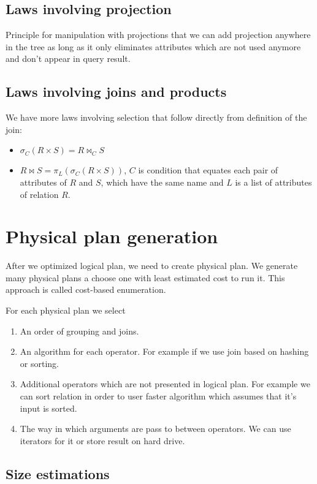 \subsection{Laws involving projection}
Principle for manipulation with projections that we can add projection anywhere in the tree as long as it only eliminates attributes which are not used anymore and don't appear in query result.
\subsection{Laws involving joins and products}

We have more laws involving selection that follow directly from definition of the join:
\begin{itemize}
\item $\sigma_{C}(R \times S)=R \Join_{C} S$
\item $R \Join S=\pi_L(\sigma_{C}(R \times S))$, $C$ is condition that equates each pair of attributes of $R$ and $S$, which have the same name and $L$ is a list of attributes of relation $R$.
\end{itemize}



\section{Physical plan generation}

After we optimized logical plan, we need to create physical plan. We generate many physical plans a choose one with least estimated cost to run it. This approach is called cost-based enumeration.

For each physical plan we select 
\begin{enumerate}
\item An order of grouping and joins.
\item An algorithm for each operator. For example if we use join based on hashing or sorting.
\item Additional operators which are not presented in logical plan. For example we can sort relation in order to user faster algorithm which assumes that it's input is sorted.
\item The way in which arguments are pass to between operators. We can use iterators for it or store result on hard drive.
\end{enumerate}

\subsection{Size estimations}

